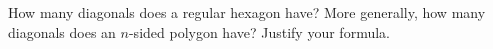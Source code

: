 How many diagonals does a regular hexagon have? More generally, how many diagonals does an $n$-sided polygon have? Justify your formula.
